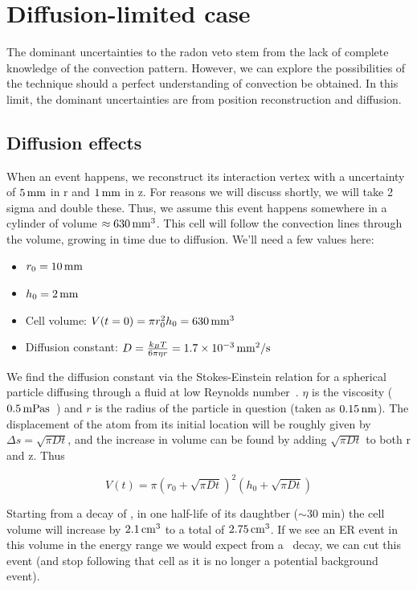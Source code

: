 \section{Diffusion-limited case}

The dominant uncertainties to the radon veto stem from the lack of complete knowledge of the convection pattern. However, we can explore the possibilities of the technique should a perfect understanding of convection be obtained. In this limit, the dominant uncertainties are from position reconstruction and diffusion.

\subsection{Diffusion effects}

When an event happens, we reconstruct its interaction vertex with a uncertainty of $5\,\mathrm{mm}$ in r and $1\,\mathrm{mm}$ in z. For reasons we will discuss shortly, we will take 2 sigma and double these. Thus, we assume this event happens somewhere in a cylinder of volume $\approx 630\,\mathrm{mm^3}$. This cell will follow the convection lines through the volume, growing in time due to diffusion. We'll need a few values here:
\begin{itemize}
    \item $r_0 = 10\,\mathrm{mm}$
    \item $h_0 = 2\,\mathrm{mm}$
    \item Cell volume: $V(t=0) = \pi r_0^2h_0 = 630\,\mathrm{mm^3}$
    \item Diffusion constant: $D = \frac{k_BT}{6\pi\eta r} = 1.7\times10^{-3}\,\mathrm{mm^2/s}$
\end{itemize}

We find the diffusion constant via the Stokes-Einstein relation for a spherical particle diffusing through a fluid at low Reynolds number~\cite{Sutherland:1905,Einstein:1905,Smoluchowski:1906}. $\eta$ is the viscosity ($0.5\,\mathrm{mPa s}$~\cite{Legros:1965}) and $r$ is the radius of the particle in question (taken as $0.15\,\mathrm{nm}$). The displacement of the atom from its initial location will be roughly given by $\Delta s = \sqrt{\pi Dt}$, and the increase in volume can be found by adding $\sqrt{\pi Dt}$ to both r and z. Thus

\begin{equation}
V(t) = \pi(r_0 + \sqrt{\pi Dt})^2(h_0 + \sqrt{\pi Dt})
\end{equation}

Starting from a decay of \Po, in one half-life of its daughtber ($\sim$30 min) the cell volume will increase by $2.1\,\mathrm{cm^3}$ to a total of $2.75\,\mathrm{cm^3}$. If we see an ER event in this volume in the energy range we would expect from a \Pb~decay, we can cut this event (and stop following that cell as it is no longer a potential background event).

